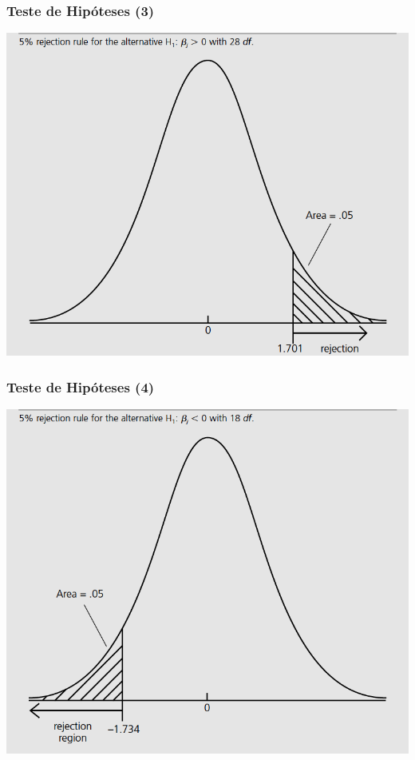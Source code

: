 \documentclass[10pt,slides,xcolor=pdftex,dvipsnames,table]{beamer}
\begin{document}

\begin{frame}[fragile]
	\frametitle{Teste de Hipóteses (3)}

\begin{center}
\includegraphics[height=0.8\textheight]{great0}
\end{center}

\end{frame}


\begin{frame}[fragile]
	\frametitle{Teste de Hipóteses (4)}

\begin{center}
\includegraphics[height=0.8\textheight]{small0}
\end{center}

\end{frame}
\end{document}
